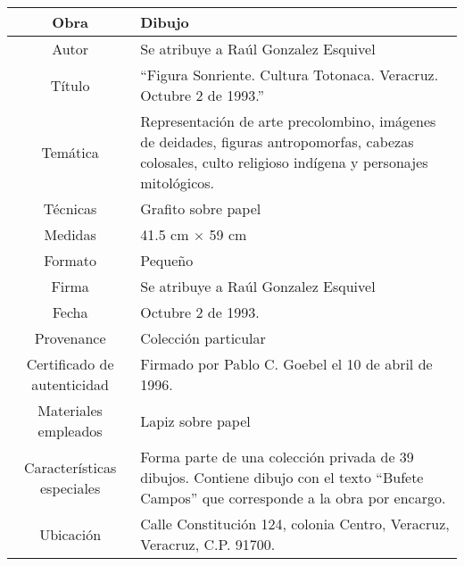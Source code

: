\documentclass[10pt,letter]{report}
\begin{document}
\begin{table}[H]
\centering
\begin{tabular}{|c|m{}|}
\hline
Obra& Dibujo	\\
\hline
Autor & Se atribuye a Ra\'ul Gonzalez Esquivel\\
\hline
T\'itulo & ``Figura Sonriente. Cultura Totonaca. Veracruz. Octubre 2 de 1993.'' \\
\hline
Tem\'atica & Representaci\'on de arte precolombino, im\'agenes de deidades, figuras antropomorfas, cabezas colosales, culto religioso ind\'igena y personajes mitol\'ogicos.\\
\hline
T\'ecnicas &Grafito sobre papel \\
\hline
Medidas & 41.5 cm $\times$ 59 cm \\
\hline
 Formato & Peque\~no \\
 \hline
 Firma & Se atribuye a Ra\'ul Gonzalez Esquivel\\ 
 \hline
  Fecha & Octubre 2 de 1993.\\
 \hline
 Provenance & Colecci\'on particular\\
 \hline
 Certificado de autenticidad& Firmado por Pablo C. Goebel el 10 de abril de 1996.  \\
 \hline 
  Materiales empleados & Lapiz sobre papel\\
 \hline
 Caracter\'isticas especiales & Forma parte de una colecci\'on privada de 39 dibujos. 
Contiene dibujo con el texto ``Bufete Campos'' que corresponde a la obra por encargo. \\
\hline 
Ubicaci\'on & Calle Constituci\'on 124, colonia Centro, Veracruz, Veracruz, C.P. 91700.\\
\hline

\end{tabular}
\end{table}
\end{document}
